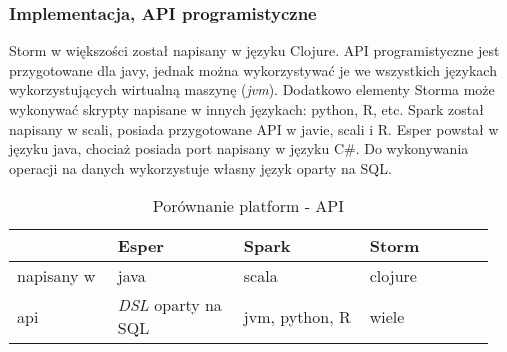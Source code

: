 \subsubsection*{Implementacja, API programistyczne}
Storm w większości został napisany w języku Clojure.
API programistyczne jest przygotowane dla javy,
jednak można wykorzystywać je we wszystkich językach wykorzystujących wirtualną maszynę (\textit{jvm}).
Dodatkowo elementy Storma może wykonywać skrypty napisane w innych językach: python, R, etc.
Spark został napisany w scali,
posiada przygotowane API w javie, scali i R.
Esper powstał w języku java, chociaż posiada port napisany w języku C\#.
Do wykonywania operacji na danych wykorzystuje własny język oparty na SQL.
\begin{table}[h]
  \label{tab:ProgrammingApi}
  \begin{tabular}{p{0.2\linewidth} p{0.25\linewidth} p{0.25\linewidth} p{0.25\linewidth}}
    & Esper & Spark & Storm \\
    \hline
    napisany w & java & scala & clojure \\
    api & \textit{DSL} oparty na SQL & jvm, python, R & wiele \\
  \end{tabular}
  \caption{Porównanie platform - API}
\end{table}
